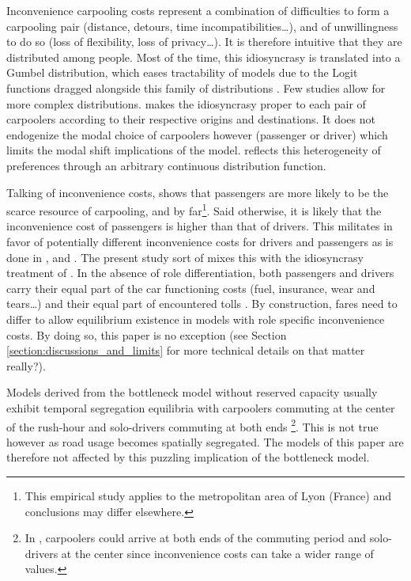 \documentclass[english, a4paper]{article}
\theoremstyle{plain}
\theoremstyle{definition}
\theoremstyle{remark}
\begin{document}
Inconvenience carpooling costs represent a combination of difficulties to form a carpooling pair (distance, detours, time incompatibilities…), and of unwillingness to do so (loss of flexibility, loss of privacy…). It is therefore intuitive that they are distributed among people. Most of the time, this idiosyncrasy is translated into a Gumbel distribution, which eases tractability of models due to the Logit functions dragged alongside this family of distributions \parencites{dahlgren_high_1998, huang_models_2000, dahlgren_high-occupancytoll_2002, qian_modeling_2011, yu_carpooling_2019, leurent_what_2024}. Few studies allow for more complex distributions. \cite{de_palma_influence_2022} makes the idiosyncrasy proper to each pair of carpoolers according to their respective origins and destinations. It does not endogenize the modal choice of carpoolers however (passenger or driver) which limits the modal shift implications of the model. \cite{konishi_carpooling_2010} reflects this heterogeneity of preferences through an arbitrary continuous distribution function.  

Talking of inconvenience costs, \cite{le_goff_are_2022} shows that passengers are more likely to be the scarce resource of carpooling, and by far\footnote{This empirical study applies to the metropolitan area of Lyon (France) and conclusions may differ elsewhere.}. Said otherwise, it is likely that the inconvenience cost of passengers is higher than that of drivers. This militates in favor of potentially different inconvenience costs for drivers and passengers as is done in \cite{liu_pricing_2017}, \cite{wang_dynamic_2019} and \cite{de_palma_influence_2022}. The present study sort of mixes this with the idiosyncrasy treatment of \cite{konishi_carpooling_2010}. In the absence of role differentiation, both passengers and drivers carry their equal part of the car functioning costs (fuel, insurance, wear and tears…) and their equal part of encountered tolls \parencites{dahlgren_high_1998, yang_carpooling_1999, dahlgren_high-occupancytoll_2002, qian_modeling_2011, yu_carpooling_2019}. By construction, fares need to differ to allow equilibrium existence in models with role specific inconvenience costs. By doing so, this paper is no exception (see Section \ref{section:discussions_and_limits} for more technical details on that matter \alert{really?}).

Models derived from the bottleneck model without reserved capacity usually exhibit temporal segregation equilibria with carpoolers commuting at the center of the rush-hour and solo-drivers commuting at both ends \parencites{liu_pricing_2017, xiao_temporal-spatial_2021, yu_carpooling_2019}\footnote{In \cite{xiao_temporal-spatial_2021}, carpoolers could arrive at both ends of the commuting period and solo-drivers at the center since inconvenience costs can take a wider range of values.}. This is not true however as road usage becomes spatially segregated. The models of this paper are therefore not affected by this puzzling implication of the bottleneck model.
\end{document}
